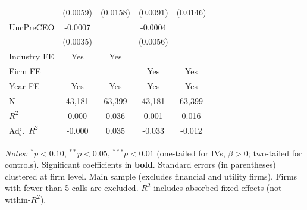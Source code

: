 \begin{landscape}
\begin{table}[H]
\begin{tabular}{lcccc}
 & (0.0059) & (0.0158) & (0.0091) & (0.0146) \\
UncPreCEO & -0.0007 &  & -0.0004 &  \\
 & (0.0035) &  & (0.0056) &  \\
\midrule
Industry FE & Yes & Yes &  &  \\
Firm FE &  &  & Yes & Yes \\
Year FE & Yes & Yes & Yes & Yes \\
\midrule
N & 43,181 & 63,399 & 43,181 & 63,399 \\
$R^2$ & 0.000 & 0.036 & 0.001 & 0.016 \\
Adj.~$R^2$ & -0.000 & 0.035 & -0.033 & -0.012 \\
\bottomrule
\end{tabular}
\begin{minipage}{\linewidth}
\vspace{2pt}\scriptsize
\textit{Notes:} $^{*}p<0.10$, $^{**}p<0.05$, $^{***}p<0.01$ (one-tailed for IVs, $\beta > 0$; two-tailed for controls).
 Significant coefficients in \textbf{bold}.
 Standard errors (in parentheses) clustered at firm level.
 Main sample (excludes financial and utility firms). Firms with fewer than 5 calls are excluded.
 $R^2$ includes absorbed fixed effects (not within-$R^2$).
\end{minipage}
\end{table}
\end{landscape}